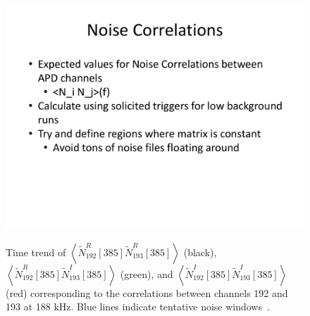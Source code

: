 \begin{figure}
\begin{center}
\includegraphics[keepaspectratio=true,page=6,width=\textwidth,clip=true,trim=0.2in 0.5in 0.5in 0.3in]{APD_Denoising_noise_correlations.pdf}
\end{center}
\renewcommand{\baselinestretch}{1}
\small\normalsize
\begin{quote}
\caption{Time trend of $\left<\widetilde{N}^R_{192}[385]\widetilde{N}^R_{193}[385]\right>$ (black), $\left<\widetilde{N}^R_{192}[385]\widetilde{N}^I_{193}[385]\right>$ (green), and $\left<\widetilde{N}^I_{192}[385]\widetilde{N}^I_{193}[385]\right>$ (red) corresponding to the correlations between channels 192 and 193 at 188 kHz.  Blue lines indicate tentative noise windows~\cite{MikeCoherentAPDNoise}.}
\label{fig:MikeNoise_192_193}
\end{quote}
\end{figure}
\renewcommand{\baselinestretch}{2}
\small\normalsize

